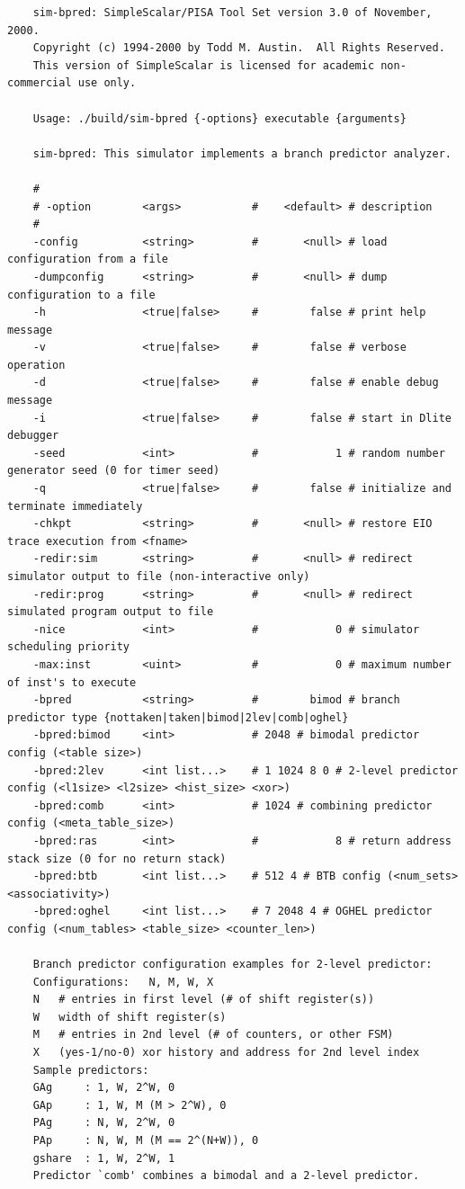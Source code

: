 {\small
\begin{verbatim}
	sim-bpred: SimpleScalar/PISA Tool Set version 3.0 of November, 2000.
	Copyright (c) 1994-2000 by Todd M. Austin.  All Rights Reserved.
	This version of SimpleScalar is licensed for academic non-commercial use only.

	Usage: ./build/sim-bpred {-options} executable {arguments}

	sim-bpred: This simulator implements a branch predictor analyzer.

	#
	# -option        <args>           #    <default> # description
	#
	-config          <string>         #       <null> # load configuration from a file
	-dumpconfig      <string>         #       <null> # dump configuration to a file
	-h               <true|false>     #        false # print help message
	-v               <true|false>     #        false # verbose operation
	-d               <true|false>     #        false # enable debug message
	-i               <true|false>     #        false # start in Dlite debugger
	-seed            <int>            #            1 # random number generator seed (0 for timer seed)
	-q               <true|false>     #        false # initialize and terminate immediately
	-chkpt           <string>         #       <null> # restore EIO trace execution from <fname>
	-redir:sim       <string>         #       <null> # redirect simulator output to file (non-interactive only)
	-redir:prog      <string>         #       <null> # redirect simulated program output to file
	-nice            <int>            #            0 # simulator scheduling priority
	-max:inst        <uint>           #            0 # maximum number of inst's to execute
	-bpred           <string>         #        bimod # branch predictor type {nottaken|taken|bimod|2lev|comb|oghel}
	-bpred:bimod     <int>            # 2048 # bimodal predictor config (<table size>)
	-bpred:2lev      <int list...>    # 1 1024 8 0 # 2-level predictor config (<l1size> <l2size> <hist_size> <xor>)
	-bpred:comb      <int>            # 1024 # combining predictor config (<meta_table_size>)
	-bpred:ras       <int>            #            8 # return address stack size (0 for no return stack)
	-bpred:btb       <int list...>    # 512 4 # BTB config (<num_sets> <associativity>)
	-bpred:oghel     <int list...>    # 7 2048 4 # OGHEL predictor config (<num_tables> <table_size> <counter_len>)

	Branch predictor configuration examples for 2-level predictor:
	Configurations:   N, M, W, X
	N   # entries in first level (# of shift register(s))
	W   width of shift register(s)
	M   # entries in 2nd level (# of counters, or other FSM)
	X   (yes-1/no-0) xor history and address for 2nd level index
	Sample predictors:
	GAg     : 1, W, 2^W, 0
	GAp     : 1, W, M (M > 2^W), 0
	PAg     : N, W, 2^W, 0
	PAp     : N, W, M (M == 2^(N+W)), 0
	gshare  : 1, W, 2^W, 1
	Predictor `comb' combines a bimodal and a 2-level predictor.



\end{verbatim}}
